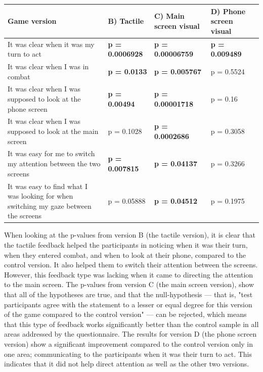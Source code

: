 \begin{center}
  \begin{tabular*}{\textwidth}{ | p{4.84cm} | p{2.5cm} | p{2.5cm} | p{2.5cm} |}
    \hline
    Game version & B) Tactile & C) Main screen visual & D) Phone screen visual \\ \hline
    It was clear when it  was my turn to act & \textbf{p = 0.0006928} & \textbf{p = 0.00006759} & \textbf{p = 0.009489} \\ \hline
    It was clear when I was in combat & \textbf{p = 0.0133} & \textbf{p = 0.005767} & p = 0.5524 \\ \hline
    It was clear when I was supposed to look at the phone screen & \textbf{p = 0.00494} & \textbf{p = 0.00001718} & p = 0.16 \\ \hline
    It was clear when I was supposed to look at the main screen & p = 0.1028 & \textbf{p = 0.0002686} & p = 0.3058 \\ \hline
    It was easy for me to switch my attention between the two screens & \textbf{p = 0.007815} & \textbf{p = 0.04137} & p = 0.3266 \\ \hline
    It was easy to find what I was looking for when switching my gaze between the screens & p = 0.05888 & \textbf{p = 0.04512} & p = 0.1975 \\
    \hline
  \end{tabular*}\label{tbl:p_table}
\end{center}

When looking at the p-values from version B (the tactile version), it is clear that the tactile feedback helped the participants in noticing when it was their turn, when they entered combat, and when to look at their phone, compared to the control version. It also helped them to switch their attention between the screens. However, this feedback type was lacking when it came to directing the attention to the main screen. 
The p-values from version C (the main screen version), show that all of the hypotheses are true, and that the null-hypothesis --- that is, "test participants agree with the statement to a lesser or equal degree for this version of the game compared to the control version" --- can be rejected, which means that this type of feedback works significantly better than the control sample in all areas addressed by the questionnaire.
The results for version D (the phone screen version) show a significant improvement compared to the control version only in one area; communicating to the participants when it was their turn to act. This indicates that it did not help direct attention as well as the other two versions. 

